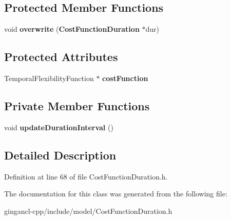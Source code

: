 \subsection*{Protected Member Functions}
\begin{CompactItemize}
\item 
void \textbf{overwrite} ({\bf CostFunctionDuration} $\ast$dur)\label{classbr_1_1pucrio_1_1telemidia_1_1ginga_1_1ncl_1_1model_1_1time_1_1CostFunctionDuration_a916906a424c2bab3c6843f5e3079be2}

\end{CompactItemize}
\subsection*{Protected Attributes}
\begin{CompactItemize}
\item 
TemporalFlexibilityFunction $\ast$ {\bf costFunction}\label{classbr_1_1pucrio_1_1telemidia_1_1ginga_1_1ncl_1_1model_1_1time_1_1CostFunctionDuration_345451139e8d36ab982c26d0bbf098ba}

\end{CompactItemize}
\subsection*{Private Member Functions}
\begin{CompactItemize}
\item 
void \textbf{updateDurationInterval} ()\label{classbr_1_1pucrio_1_1telemidia_1_1ginga_1_1ncl_1_1model_1_1time_1_1CostFunctionDuration_7bab9a7e93edbfa1d95faa3025e0fbb4}

\end{CompactItemize}


\subsection{Detailed Description}




Definition at line 68 of file CostFunctionDuration.h.

The documentation for this class was generated from the following file:\begin{CompactItemize}
\item 
gingancl-cpp/include/model/CostFunctionDuration.h\end{CompactItemize}

